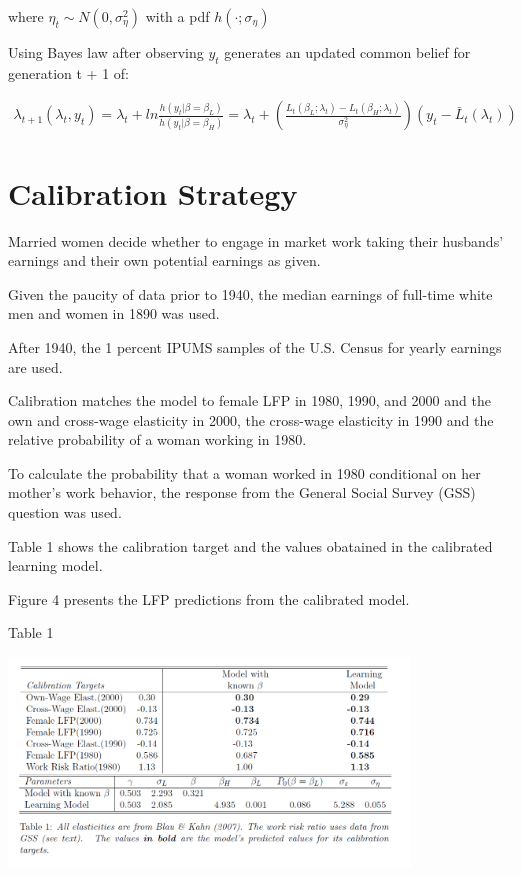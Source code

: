\documentclass[titlepage]{\econtex}
\begin{document}
where $\eta_t \sim N(0, \sigma_{\eta}^2)$ with a pdf $h(\cdot;\sigma_{\eta})$

Using Bayes law after observing $y_t$ generates an updated common belief for generation t + 1 of:

\begin{align*}
\lambda_{t+1}(\lambda_t , y_t) = \lambda_t + ln\frac{h(y_t | \beta =\beta_L)}{h(y_t|\beta = \beta_H)} = \lambda_t + (\frac{L_{t}(\beta_L ;\lambda_t)-L_t(\beta_H ; \lambda_t)}{\sigma_{\eta}^2})(y_t -\bar{L}_t(\lambda_t))
\end{align*}

\hypertarget{Calbration Strategy}{}
\section{Calibration Strategy}

Married women decide whether to engage in market work taking their husbands' earnings and their own potential earnings as given. 

Given the paucity of data prior to 1940, the median earnings of full-time white men and women in 1890 was used. 

After 1940, the 1 percent IPUMS samples of the U.S. Census for yearly earnings are used.

Calibration matches the model to female LFP in 1980, 1990, and 2000 and the own and cross-wage elasticity in 2000, the cross-wage elasticity in 1990 and the relative probability of a woman working in 1980.

To calculate the probability that a woman worked in 1980 conditional on her mother's work behavior, the response from the General Social Survey (GSS) question was used. 

Table 1 shows the calibration target and the values obatained in the calibrated learning model.

Figure 4 presents the LFP predictions from the calibrated model.


\begin{table}[H]
  \centering
    \caption{Table 1}
    \includegraphics[width=0.8\textwidth]{Table1.png}
    \label{fig:Table 1}
  \end{table}
\end{document}
